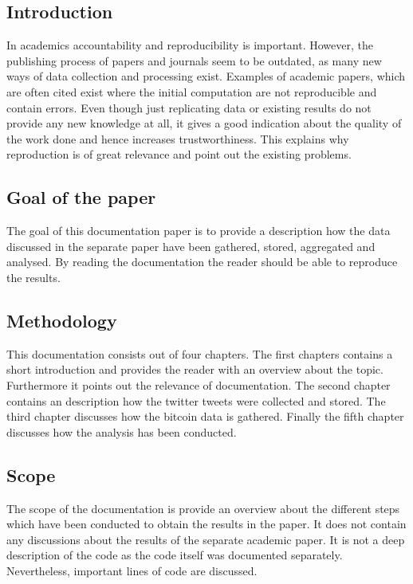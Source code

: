 \documentclass[a4paper,12pt]{article}
\begin{document}
    \clearpage
    \tableofcontents
    
    \clearpage
    
    \listoffigures
    
    \clearpage

\begin{spacing}{1.2}
\cleardoublepage{}
\section{Introduction}
In academics accountability and reproducibility is important. However, the publishing process of papers and journals seem to be outdated, as many new ways of data collection and processing exist. Examples of academic papers, which are often cited exist where the initial computation are not reproducible and contain errors. Even though just replicating data or existing results do not provide any new knowledge at all, it gives a good indication about the quality of the work done and hence increases trustworthiness. This explains why reproduction is of great relevance and point out the existing problems.

\subsection{Goal of the paper}
The goal of this documentation paper is to provide a description how the data discussed in the separate paper have been gathered, stored, aggregated and analysed. By reading the documentation the reader should be able to reproduce the results.

\subsection{Methodology}
This documentation consists out of four chapters. The first chapters contains a short introduction and provides the reader with an overview about the topic. Furthermore it points out the relevance of documentation. The second chapter contains an description how the twitter tweets were collected and stored. The third chapter discusses how the bitcoin data is gathered. Finally the fifth chapter discusses how the analysis has been conducted.

\subsection{Scope}
The scope of the documentation is provide an overview about the different steps which have been conducted to obtain the results in the paper. It does not contain any discussions about the results of the separate academic paper. It is not a deep description of the code as the code itself was documented separately. Nevertheless, important lines of code are discussed. 
\clearpage 



\end{spacing}
\end{document}
